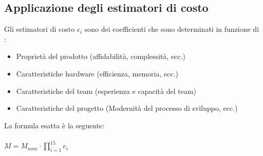 \documentclass[a4paper,12pt]{report}
\begin{document}
	\subsection{Applicazione degli estimatori di costo}
	Gli estimatori di costo $c_i$ sono dei coefficienti che sono determinati in funzione di :
	\begin{itemize}
		\item Proprietà del prodotto (affidabilità, complessità, ecc.)
		\item Caratteristiche hardware (efficienza, memoria, ecc.)
		\item Caratteristiche del team (esperienza e capacità del team)
		\item Caratteristiche del progetto (Modernità del processo di sviluppo, ecc.)
	\end{itemize}
	La formula esatta è la seguente:\\\\
	$M = M_{nom} \cdot \prod_{i = 1}^{15}c_i$
\end{document}
